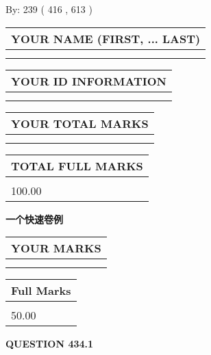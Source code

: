 \documentclass{ctexart}
\begin{document}
   
\hspace{1.0in} By: 
 239 ( 416 ,  613 )
   
   
   
   
\newpage 
\setcounter{page}{ 
   434001 } 
   
   
   
   
\noindent\begin{tabular}{|l|}
\hline
YOUR NAME (FIRST, ... LAST)  \\
\hline
 \\ 
 \\ 
\hline
\end{tabular}
\hspace{0.05in} \begin{tabular}{|l|}
\hline
 YOUR   ID   INFORMATION  \\
\hline
 \\ 
 \\ 
\hline
\end{tabular}
   
   
\vspace{0.2in}\noindent\begin{tabular}{|l|}
\hline
YOUR TOTAL MARKS  \\
\hline
 \\ 
 \\ 
\hline
\end{tabular}
\hspace{0.05in} \begin{tabular}{|l|}
\hline
TOTAL FULL MARKS  \\
\hline
 \\ 
100.00 \\
\hline
\end{tabular}
   
   
 \vspace{0.2in}
{\LARGE {\textbf{ 一个快速卷例}}}
   
   
  
\vspace{0.2in}
  
\noindent\begin{tabular}{|l|}
\hline
 YOUR MARKS  \\
\hline
 \\ 
 \\ 
\hline
\end{tabular}
\hspace{0.05in} \begin{tabular}{|l|}
\hline
 Full Marks  \\
\hline
 \\ 
50.00 \\
\hline
\end{tabular}
{\textbf{\Large{QUESTION
434.1 
}}}
  
\end{document}

